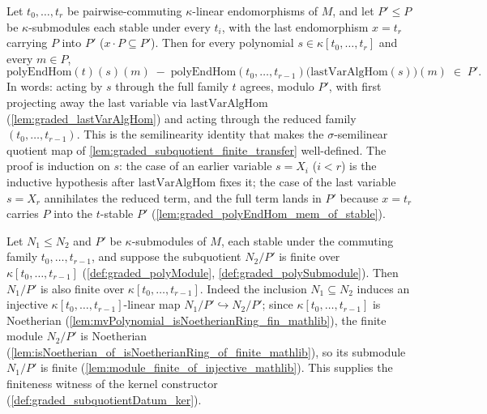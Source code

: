 \begin{lemma}\leanok
  \label{lem:graded_polyEndHom_lastVar_sub_mem}
  Let \(t_0, \dots, t_r\) be pairwise-commuting \(\kappa\)-linear endomorphisms of
  \(M\), and let \(P' \le P\) be \(\kappa\)-submodules each stable under every
  \(t_i\), with the last endomorphism \(x = t_r\) carrying \(P\) into \(P'\)
  (\(x \cdot P \subseteq P'\)). Then for every polynomial
  \(s \in \kappa[t_0, \dots, t_r]\) and every \(m \in P\),
  \[
    \mathrm{polyEndHom}(t)(s)(m)
      \;-\; \mathrm{polyEndHom}(t_0, \dots, t_{r-1})
        \bigl(\mathrm{lastVarAlgHom}(s)\bigr)(m)
      \;\in\; P' .
  \]
  In words: acting by \(s\) through the full family \(t\) agrees, modulo \(P'\), with
  first projecting away the last variable via \(\mathrm{lastVarAlgHom}\)
  (\cref{lem:graded_lastVarAlgHom}) and acting through the reduced family
  \((t_0, \dots, t_{r-1})\). This is the semilinearity identity that makes the
  \(\sigma\)-semilinear quotient map of \cref{lem:graded_subquotient_finite_transfer}
  well-defined. The proof is induction on \(s\): the case of an earlier variable
  \(s = X_i\) (\(i < r\)) is the inductive hypothesis after \(\mathrm{lastVarAlgHom}\)
  fixes it; the case of the last variable \(s = X_r\) annihilates the reduced term,
  and the full term lands in \(P'\) because \(x = t_r\) carries \(P\) into the
  \(t\)-stable \(P'\) (\cref{lem:graded_polyEndHom_mem_of_stable}).
\end{lemma}

\begin{lemma}\leanok
  \label{lem:graded_polyQuot_finite_of_le_numerator}
  Let \(N_1 \le N_2\) and \(P'\) be \(\kappa\)-submodules of \(M\), each stable under
  the commuting family \(t_0, \dots, t_{r-1}\), and suppose the subquotient
  \(N_2/P'\) is finite over \(\kappa[t_0, \dots, t_{r-1}]\)
  (\cref{def:graded_polyModule}, \cref{def:graded_polySubmodule}). Then \(N_1/P'\) is
  also finite over \(\kappa[t_0, \dots, t_{r-1}]\). Indeed the inclusion
  \(N_1 \subseteq N_2\) induces an injective \(\kappa[t_0, \dots, t_{r-1}]\)-linear
  map \(N_1/P' \hookrightarrow N_2/P'\); since
  \(\kappa[t_0, \dots, t_{r-1}]\) is Noetherian
  (\cref{lem:mvPolynomial_isNoetherianRing_fin_mathlib}), the finite module
  \(N_2/P'\) is Noetherian
  (\cref{lem:isNoetherian_of_isNoetherianRing_of_finite_mathlib}), so its submodule
  \(N_1/P'\) is finite (\cref{lem:module_finite_of_injective_mathlib}). This supplies
  the finiteness witness of the kernel constructor
  (\cref{def:graded_subquotientDatum_ker}).
\end{lemma}

